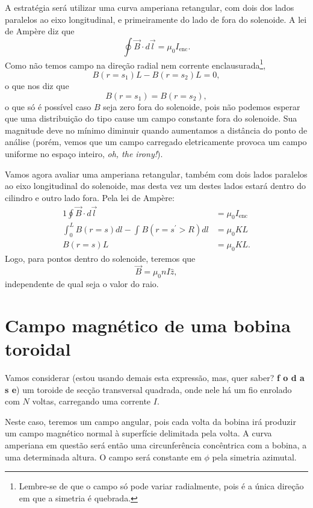 \documentclass{article}
\begin{document}
A estratégia será utilizar uma curva amperiana retangular, com dois dos lados paralelos ao eixo longitudinal, e primeiramente do lado de fora do solenoide.
A lei de Ampère diz que
\begin{equation}
 \oint \vec{B}\cdot d\vec{l} = \mu_0 I_{\mathrm{enc}}.
\end{equation}
Como não temos campo na direção radial nem corrente enclausurada\footnote{Lembre-se de que o campo só pode variar radialmente, pois é a única direção em que a
simetria é quebrada.},
\begin{equation}
 B(r = s_1) L - B(r = s_2) L = 0,
\end{equation}
o que nos diz que
\begin{equation}
 B(r = s_1) = B(r = s_2),
\end{equation}
o que só é possível caso $B$ seja zero fora do solenoide, pois não podemos esperar que uma distribuição do tipo cause um campo constante fora do solenoide. Sua magnitude
deve no mínimo diminuir quando aumentamos a distância do ponto de análise (porém, vemos que um campo carregado eletricamente provoca um campo uniforme no espaço inteiro,
\textit{oh, the irony!}).

Vamos agora avaliar uma amperiana retangular, também com dois lados paralelos ao eixo longitudinal do solenoide, mas desta vez um destes lados estará dentro do cilindro
e outro lado fora. Pela lei de Ampère:
\begin{alignat}{1}
 \oint \vec{B}\cdot d\vec{l} &= \mu_0 I_{\mathrm{enc}}\\
 \int_{0}^{L} B(r=s)dl - \int_{}B(r=s^{\prime} > R)dl &= \mu_0 K L\\
 B(r=s)L &= \mu_0 K L.
\end{alignat}
Logo, para pontos dentro do solenoide, teremos que
\begin{equation}
 \vec{B} = \mu_0 n I \hat{z},
\end{equation}
independente de qual seja o valor do raio.

\section{Campo magnético de uma bobina toroidal}
Vamos considerar (estou usando demais esta expressão, mas, quer saber? \textbf{{\color{pink}f o d a s e}}) um toroide de secção transversal quadrada, onde nele há um
fio enrolado com $N$ voltas, carregando uma corrente $I$.

Neste caso, teremos um campo angular, pois cada volta da bobina irá produzir um campo magnético normal à superfície delimitada pela volta. A curva amperiana em questão
será então uma circunferência concêntrica com a bobina, a uma determinada altura. O campo será constante em $\phi$ pela simetria azimutal.
\end{document}

